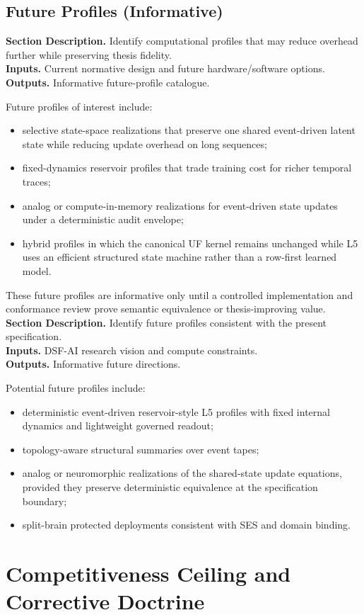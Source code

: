 \documentclass[11pt]{report}
\newcommand{\meta}[3]{\textbf{Section Description.} #1\\
\textbf{Inputs.} #2\\
\textbf{Outputs.} #3\par}
\begin{document}
\section{Future Profiles (Informative)}
\meta{Identify computational profiles that may reduce overhead further while preserving thesis fidelity.}{Current normative design and future hardware/software options.}{Informative future-profile catalogue.}

Future profiles of interest include:
\begin{itemize}
    \item selective state-space realizations that preserve one shared event-driven latent state while reducing update overhead on long sequences;
    \item fixed-dynamics reservoir profiles that trade training cost for richer temporal traces;
    \item analog or compute-in-memory realizations for event-driven state updates under a deterministic audit envelope;
    \item hybrid profiles in which the canonical UF kernel remains unchanged while L5 uses an efficient structured state machine rather than a row-first learned model.
\end{itemize}
These future profiles are informative only until a controlled implementation and conformance review prove semantic equivalence or thesis-improving value.
\meta{Identify future profiles consistent with the present specification.}{DSF-AI research vision and compute constraints.}{Informative future directions.}

Potential future profiles include:
\begin{itemize}
    \item deterministic event-driven reservoir-style L5 profiles with fixed internal dynamics and lightweight governed readout;
    \item topology-aware structural summaries over event tapes;
    \item analog or neuromorphic realizations of the shared-state update equations, provided they preserve deterministic equivalence at the specification boundary;
    \item split-brain protected deployments consistent with SES and domain binding.
\end{itemize}



\chapter{Competitiveness Ceiling and Corrective Doctrine}
\end{document}
